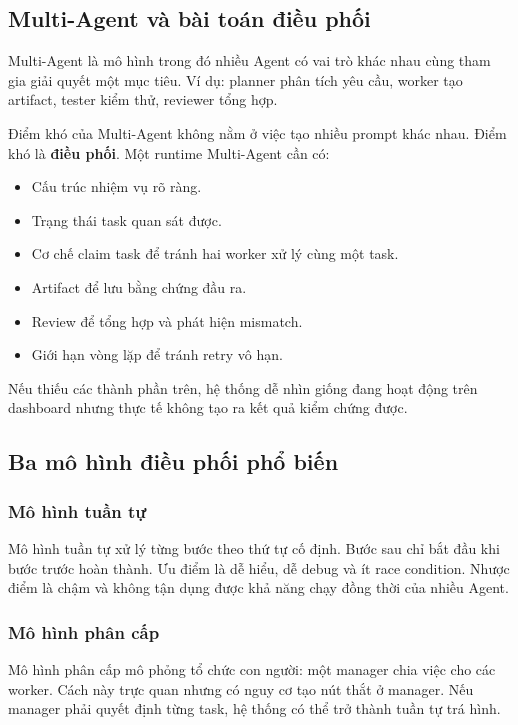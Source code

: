 \documentclass[12pt,a4paper]{article}
\begin{document}
\subsection{Multi-Agent và bài toán điều phối}

Multi-Agent là mô hình trong đó nhiều Agent có vai trò khác nhau cùng tham gia giải quyết một mục tiêu. Ví dụ: planner phân tích yêu cầu, worker tạo artifact, tester kiểm thử, reviewer tổng hợp.

Điểm khó của Multi-Agent không nằm ở việc tạo nhiều prompt khác nhau. Điểm khó là \textbf{điều phối}. Một runtime Multi-Agent cần có:

\begin{itemize}
    \item Cấu trúc nhiệm vụ rõ ràng.
    \item Trạng thái task quan sát được.
    \item Cơ chế claim task để tránh hai worker xử lý cùng một task.
    \item Artifact để lưu bằng chứng đầu ra.
    \item Review để tổng hợp và phát hiện mismatch.
    \item Giới hạn vòng lặp để tránh retry vô hạn.
\end{itemize}

Nếu thiếu các thành phần trên, hệ thống dễ nhìn giống đang hoạt động trên dashboard nhưng thực tế không tạo ra kết quả kiểm chứng được.

\subsection{Ba mô hình điều phối phổ biến}

\subsubsection{Mô hình tuần tự}

Mô hình tuần tự xử lý từng bước theo thứ tự cố định. Bước sau chỉ bắt đầu khi bước trước hoàn thành. Ưu điểm là dễ hiểu, dễ debug và ít race condition. Nhược điểm là chậm và không tận dụng được khả năng chạy đồng thời của nhiều Agent.

\subsubsection{Mô hình phân cấp}

Mô hình phân cấp mô phỏng tổ chức con người: một manager chia việc cho các worker. Cách này trực quan nhưng có nguy cơ tạo nút thắt ở manager. Nếu manager phải quyết định từng task, hệ thống có thể trở thành tuần tự trá hình.
\end{document}
